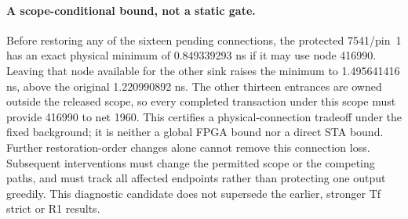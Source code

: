 \paragraph{A scope-conditional bound, not a static gate.}
Before restoring any of the sixteen pending connections, the protected 7541/pin~1 has an exact physical minimum of 0.849339293 ns if it may use node 416990. Leaving that node available for the other sink raises the minimum to 1.495641416 ns, above the original 1.220990892 ns. The other thirteen entrances are owned outside the released scope, so every completed transaction under this scope must provide 416990 to net 1960. This certifies a physical-connection tradeoff under the fixed background; it is neither a global FPGA bound nor a direct STA bound. Further restoration-order changes alone cannot remove this connection loss. Subsequent interventions must change the permitted scope or the competing paths, and must track all affected endpoints rather than protecting one output greedily. This diagnostic candidate does not supersede the earlier, stronger Tf strict or R1 results.
